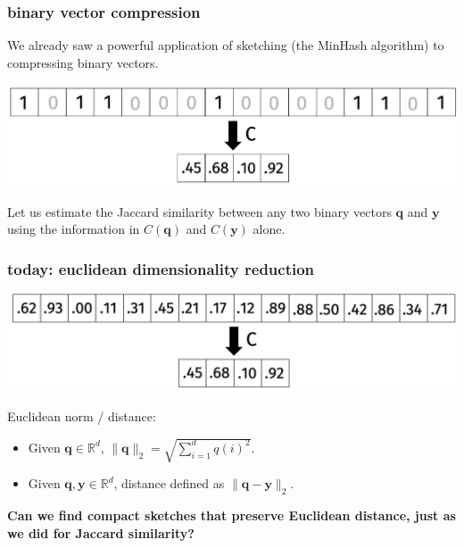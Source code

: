 \documentclass[compress,handout]{beamer}
\newcommand{\bv}[1]{\mathbf{#1}}
\newcommand{\R}{\mathbb{R}}
\begin{document}
\begin{frame}
	\frametitle{binary vector compression}
	We already saw a powerful application of sketching (the MinHash algorithm) to compressing binary vectors. 
	
		\begin{center}
		\vspace{-.5em}
		\includegraphics[width=.8\textwidth]{compression.png}
		\vspace{-.5em}
	\end{center}

	Let us estimate the Jaccard similarity between any two binary vectors $\bv{q}$ and $\bv{y}$ using the information in $C(\bv{q})$ and $C(\bv{y})$ alone. 
\end{frame}

\begin{frame}
	\frametitle{today: euclidean dimensionality reduction}
	\begin{center}
		\includegraphics[width=\textwidth]{euclidean_dim_red2.png}
	\end{center}
	Euclidean norm / distance:
	\begin{itemize}
		\item Given $\bv{q} \in \R^d$, $\|\bv{q}\|_2 = \sqrt{\sum_{i=1}^d {q}(i)^2}$.
		\item Given $\bv{q}, \bv{y} \in \R^d$, distance defined as $\|\bv{q} - \bv{y}\|_2$.
	\end{itemize}
	
	\begin{center}
		\alert{
	\textbf{Can we find compact sketches that preserve Euclidean distance, just as we did for Jaccard similarity?}}
	\end{center}
\end{frame}
\end{document}
